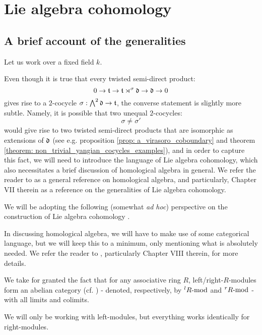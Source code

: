\section{Lie algebra cohomology}
    \subsection{A brief account of the generalities}
        Let us work over a fixed field $k$.
    
        Even though it is true that every twisted semi-direct product:
            $$0 \to \t \to \t \rtimes^{\sigma} \d \to \d \to 0$$
        gives rise to a $2$-cocycle $\sigma: \bigwedge^2 \d \to \t$, the converse statement is slightly more subtle. Namely, it is possible that two unequal $2$-cocycles:
            $$\sigma \not = \sigma'$$
        would give rise to two twisted semi-direct products that are isomorphic as extensions of $\d$ (see e.g. proposition \ref{prop: a_virasoro_coboundary} and theorem \ref{theorem: non_trivial_yangian_cocycles_examples}), and in order to capture this fact, we will need to introduce the language of Lie algebra cohomology, which also necessitates a brief discussion of homological algebra in general. We refer the reader to \cite{hilton_stammbach_homological_algebra} as a general reference on homological algebra, and particularly, Chapter VII therein as a reference on the generalities of Lie algebra cohomology. 

        We will be adopting the following (somewhat \textit{ad hoc}) perspective on the construction of Lie algebra cohomology .
        \begin{convention}
            In discussing homological algebra, we will have to make use of some categorical language, but we will keep this to a minimum, only mentioning what is absolutely needed. We refer the reader to \cite{maclane}, particularly Chapter VIII therein, for more details.
        \end{convention}
        \begin{convention}
            We take for granted the fact that for any associative ring $R$, left/right-$R$-modules form an abelian category (cf. \cite[Section VIII.3, p. 198]{maclane}) - denoted, respectively, by ${}^lR\mod$ and ${}^rR\mod$ - with all limits and colimits.

            We will only be working with left-modules, but everything works identically for right-modules.
        \end{convention}


